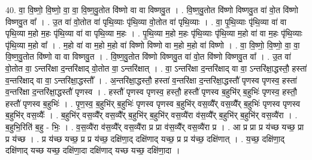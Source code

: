 \documentclass[17pt]{extarticle}
\begin{document}
40. वा॒ वि॒ष्णो॒ वि॒ष्णो॒ वा॒ वा॒ वि॒ष्ण॒वु॒तोत वि॑ष्णो वा वा विष्णवु॒त । . वि॒ष्ण॒वु॒तोत वि॑ष्णो विष्णवु॒त वा॑ वो॒त वि॑ष्णो विष्णवु॒त वा᳚ । . उ॒त वा॑ वो॒तोत वा॑ पृथि॒व्याः पृ॑थि॒व्या वो॒तोत वा॑ पृथि॒व्याः । . वा॒ पृ॒थि॒व्याः पृ॑थि॒व्या वा॑ वा पृथि॒व्या म॒हो म॒हः पृ॑थि॒व्या वा॑ वा पृथि॒व्या म॒हः । . पृ॒थि॒व्या म॒हो म॒हः पृ॑थि॒व्याः पृ॑थि॒व्या म॒हो वा॑ वा म॒हः पृ॑थि॒व्याः पृ॑थि॒व्या म॒हो वा᳚ । . म॒हो वा॑ वा म॒हो म॒हो वा॑ विष्णो विष्णो वा म॒हो म॒हो वा॑ विष्णो । . वा॒ वि॒ष्णो॒ वि॒ष्णो॒ वा॒ वा॒ वि॒ष्ण॒वु॒तोत वि॑ष्णो वा वा विष्णवु॒त । . वि॒ष्ण॒वु॒तोत वि॑ष्णो विष्णवु॒त वा॑ वो॒त वि॑ष्णो विष्णवु॒त वा᳚ । . उ॒त वा॑ वो॒तोत वा॒ ऽन्तरि॑क्षा द॒न्तरि॑क्षाद् वो॒तोत वा॒ ऽन्तरि॑क्षात् । . वा॒ ऽन्तरि॑क्षा द॒न्तरि॑क्षाद् वा वा॒ ऽन्तरि॑क्षा॒द्धस्तौ॒ हस्ता॑ व॒न्तरि॑क्षाद् वा वा॒ ऽन्तरि॑क्षा॒द्धस्तौ᳚ । . अ॒न्तरि॑क्षा॒द्धस्तौ॒ हस्ता॑ व॒न्तरि॑क्षा द॒न्तरि॑क्षा॒द्धस्तौ॑ पृणस्व पृणस्व॒ हस्ता॑ व॒न्तरि॑क्षा द॒न्तरि॑क्षा॒द्धस्तौ॑ पृणस्व । . हस्तौ॑ पृणस्व पृणस्व॒ हस्तौ॒ हस्तौ॑ पृणस्व ब॒हुभि॑र् ब॒हुभिः॑ पृणस्व॒ हस्तौ॒ हस्तौ॑ पृणस्व ब॒हुभिः॑ । . पृ॒ण॒स्व॒ ब॒हुभि॑र् ब॒हुभिः॑ पृणस्व पृणस्व ब॒हुभि॑र् वस॒व्यै᳚र् वस॒व्यै᳚र् ब॒हुभिः॑ पृणस्व पृणस्व ब॒हुभि॑र् वस॒व्यैः᳚ । . ब॒हुभि॑र् वस॒व्यै᳚र् वस॒व्यै᳚र् ब॒हुभि॑र् ब॒हुभि॑र् वस॒व्यै॑रा व॑स॒व्यै᳚र् ब॒हुभि॑र् ब॒हुभि॑र् वस॒व्यै॑रा । . ब॒हुभि॒रिति॑ ब॒हु - भिः॒ । . व॒स॒व्यै॑रा व॑स॒व्यै᳚र् वस॒व्यै॑रा प्र प्रा व॑स॒व्यै᳚र् वस॒व्यै॑रा प्र । . आ प्र प्रा प्र य॑च्छ यच्छ॒ प्रा प्र य॑च्छ । . प्र य॑च्छ यच्छ॒ प्र प्र य॑च्छ॒ दक्षि॑णा॒द् दक्षि॑णाद् यच्छ॒ प्र प्र य॑च्छ॒ दक्षि॑णात् । . य॒च्छ॒ दक्षि॑णा॒द् दक्षि॑णाद् यच्छ यच्छ॒ दक्षि॑णा॒दा दक्षि॑णाद् यच्छ यच्छ॒ दक्षि॑णा॒दा । \newline
\pagebreak
{}
\end{document}
